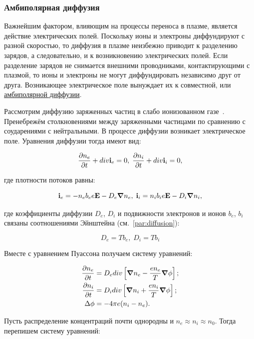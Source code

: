 \documentclass[10pt, a4paper]{article}
\begin{document}
\subsubsection{Амбиполярная диффузия}

Важнейшим фактором, влияющим на процессы переноса в плазме, является действие электрических полей. Поскольку ионы и электроны диффундируют с разной скоростью, то диффузия в плазме неизбежно приводит к разделению зарядов, а следовательно, и к возникновению электрических полей. Если разделение зарядов не снимается внешними проводниками, контактирующими с плазмой, то ионы и электроны не могут диффундировать независимо друг от друга. Возникающее электрическое поле вынуждает их к совместной, или \uline{амбиполярной диффузии}.

Рассмотрим диффузию заряженных частиц в слабо ионизованном газе~\cite{landau10}. Пренебрежём столкновениями между заряженными частицами по сравнению с соударениями с нейтральными. В процессе диффузии возникает электрическое поле. Уравнения диффузии тогда имеют вид:

\begin{equation*}
	\pdv{n_e}{t} + div\vb{i}_e = 0,\;\pdv{n_i}{t} + div\vb{i}_i = 0,
\end{equation*}

где плотности потоков равны:

\begin{equation*}
	\vb{i}_e = -n_eb_ee\vb{E}-D_e\grad{n_e},\;\vb{i}_i = n_ib_ie\vb{E}-D_i\grad{n_i},
\end{equation*}

где коэффициенты диффузии $D_e$, $D_i$ и подвижности электронов и ионов $b_e$, $b_i$ связаны соотношениями Эйнштейна (см.~\ref{par:diffusion}):

\begin{equation*}
	D_e = Tb_e,\;D_i = Tb_i
\end{equation*}

Вместе с уравнением Пуассона получаем систему уравнений:

\begin{align*}
	\pdv{n_e}{t} &= D_e div\left[\grad{n_e}-\frac{en_e}{T} \grad{\phi}\right]; \\
	\pdv{n_i}{t} &= D_i div\left[\grad{n_i}+\frac{en_i}{T} \grad{\phi}\right]; \\
	\Delta \phi &= -4\pi e(n_i-n_e).
\end{align*}

Пусть распределение концентраций почти однородны и $n_e\approx n_i\approx n_0$. Тогда перепишем систему уравнений:
\end{document}
